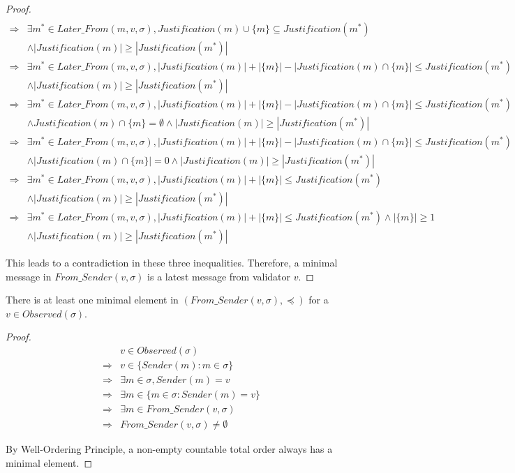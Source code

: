 \begin{proof}
\begin{align*}
  \\
  \Longrightarrow& \exists m^* \in Later\_From(m, v, \sigma), Justification(m) \cup \{m\} \subseteq Justification(m^*) \\ &\land |Justification(m)| \geq |Justification(m^*)|
  \\
  \Longrightarrow& \exists m^* \in Later\_From(m, v, \sigma), |Justification(m)| + |\{m\}| - |Justification(m) \cap \{m\}| \leq Justification(m^*) \\ &\land |Justification(m)| \geq |Justification(m^*)|
  \\
  \Longrightarrow& \exists m^* \in Later\_From(m, v, \sigma), |Justification(m)| + |\{m\}| - |Justification(m) \cap \{m\}| \leq Justification(m^*) \\ &\land Justification(m) \cap \{m\} = \emptyset \land |Justification(m)| \geq |Justification(m^*)|
  \\
  \Longrightarrow& \exists m^* \in Later\_From(m, v, \sigma), |Justification(m)| + |\{m\}| - |Justification(m) \cap \{m\}| \leq Justification(m^*) \\ &\land |Justification(m) \cap \{m\}| = 0 \land |Justification(m)| \geq |Justification(m^*)|
  \\
  \Longrightarrow& \exists m^* \in Later\_From(m, v, \sigma), |Justification(m)| + |\{m\}| \leq Justification(m^*) \\ &\land |Justification(m)| \geq |Justification(m^*)|
  \\
  \Longrightarrow& \exists m^* \in Later\_From(m, v, \sigma), |Justification(m)| + |\{m\}| \leq Justification(m^*) \land |\{m\}| \geq 1 \\ &\land |Justification(m)| \geq |Justification(m^*)|
\end{align*}

This leads to a contradiction in these three inequalities. Therefore, a minimal message in $From\_Sender(v, \sigma)$ is a latest message from validator $v$.
\end{proof}

\begin{lemma}
There is at least one minimal element in $(From\_Sender(v, \sigma), \preceq)$ for a $v \in Observed(\sigma)$.
\end{lemma}

\begin{proof}
  \begin{align*}
    &v \in Observed(\sigma)
    \\
    \Longrightarrow& v \in \{ Sender(m) : m \in \sigma \}
    \\
    \Longrightarrow& \exists m \in \sigma, Sender(m) = v
    \\
    \Longrightarrow& \exists m \in \{m \in \sigma: Sender(m) = v\}
    \\
    \Longrightarrow& \exists m \in From\_Sender(v, \sigma)
    \\
    \Longrightarrow& From\_Sender(v, \sigma) \not = \emptyset
  \end{align*}

  By Well-Ordering Principle, a non-empty countable total order always has a minimal element.
\end{proof}

